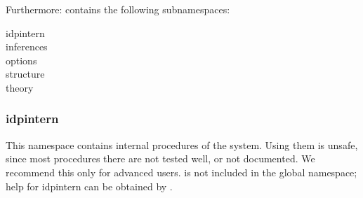 Furthermore:  contains the following subnamespaces:
\begin{description}
 \item[idpintern]
 \item[inferences]
 \item[options]
 \item[structure]
 \item[theory]
\end{description}

\subsubsection{idpintern}
This namespace contains internal procedures of the \idp system. Using them is unsafe, since most procedures there are not tested well, or not documented. We recommend this only for advanced users.  is not included in the global namespace; help for idpintern can be obtained by .

